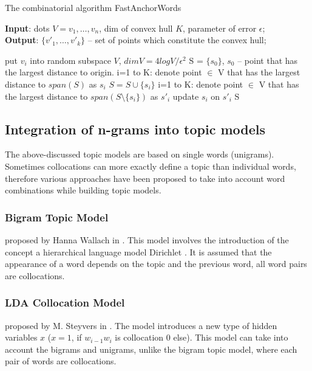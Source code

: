 \documentclass[runningheads,a4paper]{llncs}
\begin{document}
	
	\begin{algorithm}[H]
		\caption{The combinatorial algorithm FastAnchorWords}
		\label{find_anch}
		\textbf{Input}: dots $V = {v_1, \dots, v_n}$, dim of convex hull $K$, parameter of error $\epsilon$;\\
		\textbf{Output}: $\{v'_{1}, \dots, v'_{k}\}$ -- set of points which constitute the convex hull; 
		\begin{algorithmic}[1]
			\State put $v_i$ into random subspace $V$,  $dim V = 4log V / \epsilon^2$
			\State S = $\{s_0\}$, $s_0$ -- point that has the largest distance to origin.
			\ForAll i=1 to K:
			\State denote point $\in$ V that has the largest distance to $span(S)$ as $s_i$
			\State $S = S \cup \{s_i\}$
			\EndFor
			\ForAll i=1 to K:
			\State denote point $\in$ V that has the largest distance to $span(S\setminus\{s_i\})$ as $s'_i$
			\State update  $s_i$ on $s'_i$
			\EndFor
			\Return  S
		\end{algorithmic}
	\end{algorithm}
	
	\subsection{Integration of n-grams into topic models}

   The above-discussed topic models are based on single words (unigrams). Sometimes collocations can more exactly define a topic than individual words, therefore various approaches have been proposed to take into account word combinations while building  topic models. 
   
	\subsubsection{Bigram Topic Model} proposed by Hanna Wallach in \cite{wallach2006topic}. This model involves the introduction of the concept a hierarchical language model Dirichlet \cite{mackay1995hierarchical}. It is assumed that the appearance of a word depends on the topic and the previous word, all word pairs are collocations.
	
	\subsubsection{LDA Collocation Model} proposed by M. Steyvers in \cite{steyvers2005matlab}. The model introduces a new type of hidden variables $x$ ($x = 1$, if $w_{i-1}w_{i}$ is collocation 0 else). This model can take into account the bigrams and unigrams, unlike the bigram topic model, where each pair of words are collocations.
	
\end{document}
